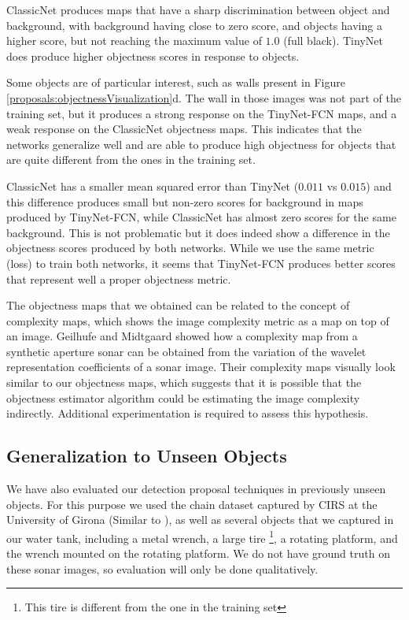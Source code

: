 ClassicNet produces maps that have a sharp discrimination between object and background, with background having close to zero score, and objects having a higher score, but not reaching the maximum value of $1.0$ (full black). TinyNet does produce higher objectness scores in response to objects.

Some objects are of particular interest, such as walls present in Figure \ref{proposals:objectnessVisualization}d. The wall in those images was not part of the training set, but it produces a strong response on the TinyNet-FCN maps, and a weak response on the ClassicNet objectness maps. This indicates that the networks generalize well and are able to produce high objectness for objects that are quite different from the ones in the training set.

ClassicNet has a smaller mean squared error than TinyNet ($0.011$ vs $0.015$) and this difference produces small but non-zero scores for background in maps produced by TinyNet-FCN, while ClassicNet has almost zero scores for the same background. This is not problematic but it does indeed show a difference in the objectness scores produced by both networks. While we use the same metric (loss) to train both networks, it seems that TinyNet-FCN produces better scores that represent well a proper objectness metric.

The objectness maps that we obtained can be related to the concept of complexity maps, which shows the image complexity metric as a map on top of an image. Geilhufe and Midtgaard \cite{geilhufe2014quantifying} showed how a complexity map from a synthetic aperture sonar can be obtained from the variation of the wavelet representation coefficients of a sonar image. Their complexity maps visually look similar to our objectness maps, which suggests that it is possible that the objectness estimator algorithm could be estimating the image complexity indirectly. Additional experimentation is required to assess this hypothesis.

\FloatBarrier
\subsection{Generalization to Unseen Objects}

We have also evaluated our detection proposal techniques in previously unseen objects. For this purpose we used the chain dataset captured by CIRS at the University of Girona (Similar to \cite{hurtos2013automatic}), as well as several objects that we captured in our water tank, including a metal wrench, a large tire \footnote[][1em]{This tire is different from the one in the training set}, a rotating platform, and the wrench mounted on the rotating platform.
We do not have ground truth on these sonar images, so evaluation will only be done qualitatively.

